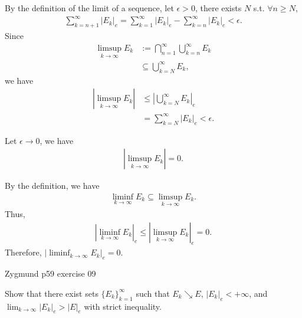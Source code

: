 \documentclass[UTF8,a4paper,10pt]{article}
\begin{document}
  \begin{solution}

  By the definition of the limit of a sequence, let \(\epsilon>0\), there exists \(N\) s.t. \(\forall n\geq N\),
  \begin{equation*}
    \begin{aligned}
      \sum_{k=n+1}^{\infty}|E_k|_e = \sum_{k=1}^{\infty}|E_k|_e - \sum_{k=n}^{\infty}|E_k|_e < \epsilon.
    \end{aligned}
  \end{equation*}
Since
  \begin{equation*}
    \begin{aligned}
      \limsup_{k\to\infty}E_k &:= \bigcap_{n=1}^{\infty}  \bigcup_{k=n}^{\infty} E_k\\
      &\subseteq \bigcup_{k=N}^{\infty} E_k,
    \end{aligned}
  \end{equation*}
  we have
  \begin{equation*}
    \begin{aligned}
      |\limsup_{k\to\infty}E_k|&\leq |\bigcup_{k=N}^{\infty} E_k|_e\\
      &=\sum_{k=N}^{\infty}|E_k|_e <\epsilon.
    \end{aligned}
  \end{equation*}

  Let \(\epsilon\to 0\), we have
  \begin{equation*}
    \begin{aligned}
      |\limsup_{k\to\infty}E_k|=0.
    \end{aligned}
  \end{equation*}

  \dotfill

  By the definition, we have
  \begin{equation*}
    \begin{aligned}
      \liminf_{k\to\infty}E_k \subseteq \limsup_{k\to\infty}E_k.
    \end{aligned}
  \end{equation*}
Thus, 
\begin{equation*}
  \begin{aligned}
    |\liminf_{k\to\infty}E_k|_e \leq |\limsup_{k\to\infty}E_k|_e = 0.
  \end{aligned}
\end{equation*}
Therefore, \( |\liminf_{k\to\infty}E_k|_e = 0\).


  \end{solution}


  \begin{Problem}[]{Zygmund p59 exercise 09}

    Show that there exist sets \(\{E_k\}_{k=1}^{\infty}\) such that \(E_k \searrow  E\), \(|E_k|_e < +\infty\), and \(\lim_{k\to\infty} |E_k|_e > |E|_e\) with strict inequality.
  \end{Problem}
\end{document}
